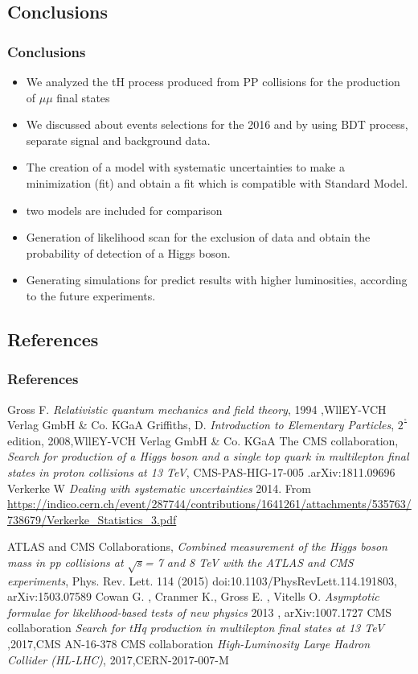 \documentclass[11pt]{beamer}
\begin{document}
\begin{frame}
\section{Conclusions}
\frametitle{Conclusions}
\begin{itemize}
	\item We analyzed the tH process produced from PP collisions for the production of $\mu\mu$ final states   
	\item We discussed about events selections for the 2016 and by using BDT process, separate signal and background data. 
	\item The creation of a model with systematic uncertainties to make a minimization (fit) and obtain a fit which is compatible with Standard Model.
	\item two models are included for comparison 
	\item Generation of likelihood scan for the exclusion of data and obtain the probability of detection of a Higgs boson.
	\item Generating simulations for predict results with higher luminosities, according to the future experiments.  
\end{itemize}
\end{frame}
	\begin{thebibliography}{99}
	\begin{frame}
	\section{References}
	\frametitle{References}
	
	Gross F. \textit{Relativistic quantum mechanics and field theory}, 1994 ,WllEY-VCH Verlag GmbH \& Co. KGaA
	 Griffiths, D. \textit{Introduction to Elementary Particles}, $2^\frac{\circ}{}$ edition, 2008,WllEY-VCH Verlag GmbH \& Co. KGaA
		The CMS collaboration, \textit{Search for production of a Higgs boson and a single top
	quark in multilepton final states in proton collisions at 13 TeV}, CMS-PAS-HIG-17-005 .arXiv:1811.09696
	Verkerke W \textit{Dealing with systematic uncertainties} 2014. From
\url{https://indico.cern.ch/event/287744/contributions/1641261/attachments/535763/738679/Verkerke_Statistics_3.pdf}
\end{frame}

\begin{frame}
 ATLAS and CMS
Collaborations, \textit{Combined measurement of the Higgs boson mass in
	pp collisions at $\sqrt{s}$= 7 and 8 TeV with the ATLAS and CMS experiments}, Phys. Rev. Lett.
114 (2015) doi:10.1103/PhysRevLett.114.191803, arXiv:1503.07589
 Cowan G. , Cranmer K., Gross E. , Vitells O.\textit{ Asymptotic formulae for
	likelihood-based tests of new physics} 2013 , arXiv:1007.1727
CMS collaboration \textit{Search for tHq production in multilepton final states at 13 TeV} ,2017,CMS AN-16-378
CMS collaboration \textit{High-Luminosity Large Hadron Collider (HL-LHC)}, 2017,CERN-2017-007-M


\end{frame}
\end{thebibliography}
\end{document}
